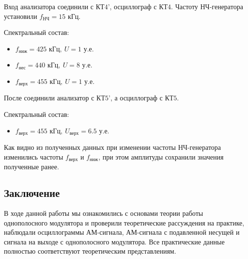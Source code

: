 Вход анализатора соединили с $\text{КТ4'}$, осциллограф с $\text{КТ4}$. Частоту НЧ-генератора установили $f_{\text{НЧ}}=15 \text{ кГц.}$

Спектральный состав:
\begin{itemize}
	\item $f_{\text{ниж}}=425 \text{ кГц},~ U=1 \text{ у.е.}$
	\item $f_{\text{нес}}=440 \text{ кГц},~ U=8 \text{ у.е.}$
	\item $f_{\text{верх}}=455 \text{ кГц},~ U=1 \text{ у.е.}$
\end{itemize}

После соединили анализатор с $\text{КТ5'}$, а осциллограф с $\text{КТ5}$.

Спектральный состав:
\begin{itemize}
	\item $f_{\text{верх}}=455 \text{ кГц}, ~U_{\text{верх}}=6.5 \text{ у.е.}$
\end{itemize}

Как видно из полученных данных при изменении частоты НЧ-генератора изменились частоты $f_{\text{верх}}$ и $f_{\text{ниж}}$, при этом амплитуды сохранили значения полученные ранее.
\subsection{Заключение}

В ходе данной работы мы ознакомились с основами теории работы однополосного модулятора  и проверили теоретические рассуждения на практике, наблюдали осциллограммы АМ-сигнала, АМ-сигнала с подавленной несущей и сигнала на выходе с однополосного модулятора. Все практические данные полностью соответствуют теоретическим представлениям. 


